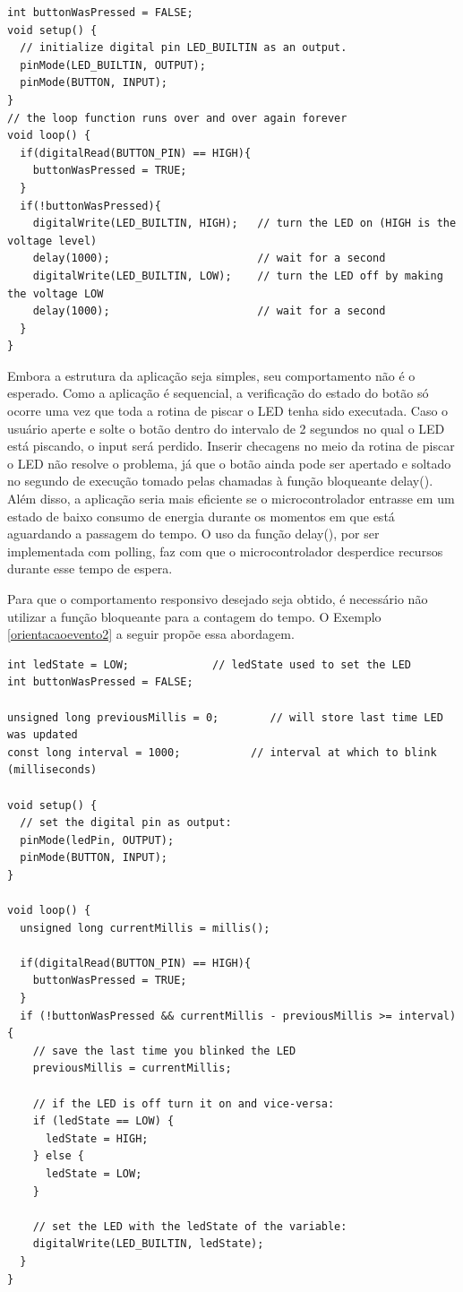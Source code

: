 \documentclass[11pt]{article}
\begin{document}
\begin{lstlisting}[style=CStyle,label=orientacaoevento1,caption=Aplicação bloqueante]
int buttonWasPressed = FALSE;
void setup() {
  // initialize digital pin LED_BUILTIN as an output.
  pinMode(LED_BUILTIN, OUTPUT);
  pinMode(BUTTON, INPUT);
}
// the loop function runs over and over again forever
void loop() {
  if(digitalRead(BUTTON_PIN) == HIGH){
    buttonWasPressed = TRUE;
  }
  if(!buttonWasPressed){ 
    digitalWrite(LED_BUILTIN, HIGH);   // turn the LED on (HIGH is the voltage level)
    delay(1000);                       // wait for a second
    digitalWrite(LED_BUILTIN, LOW);    // turn the LED off by making the voltage LOW
    delay(1000);                       // wait for a second
  }
}
\end{lstlisting}
\par Embora a estrutura da aplicação seja simples, seu comportamento não é o esperado. Como a aplicação é sequencial, a verificação do estado do botão só ocorre uma vez que toda a rotina de piscar o LED tenha sido executada. Caso o usuário aperte e solte o botão dentro do intervalo de 2 segundos no qual o LED está piscando, o input será perdido. Inserir checagens no meio da rotina de piscar o LED não resolve o problema, já que o botão ainda pode ser apertado e soltado no segundo de execução tomado pelas chamadas à função bloqueante delay(). Além disso, a aplicação seria mais eficiente se o microcontrolador entrasse em um estado de baixo consumo de energia durante os momentos em que está aguardando a passagem do tempo. O uso da função delay(), por ser implementada com polling, faz com que o microcontrolador desperdice recursos durante esse tempo de espera.
\par Para que o comportamento responsivo desejado seja obtido, é necessário não utilizar a função bloqueante para a contagem do tempo. O Exemplo \ref{orientacaoevento2} a seguir propõe essa abordagem.
\begin{lstlisting}[style=CStyle,label=orientacaoevento2,caption=Aplicação não bloqueante]
int ledState = LOW;             // ledState used to set the LED
int buttonWasPressed = FALSE;

unsigned long previousMillis = 0;        // will store last time LED was updated
const long interval = 1000;           // interval at which to blink (milliseconds)

void setup() {
  // set the digital pin as output:
  pinMode(ledPin, OUTPUT);
  pinMode(BUTTON, INPUT);
}

void loop() {
  unsigned long currentMillis = millis();

  if(digitalRead(BUTTON_PIN) == HIGH){
    buttonWasPressed = TRUE;
  }
  if (!buttonWasPressed && currentMillis - previousMillis >= interval) {
    // save the last time you blinked the LED
    previousMillis = currentMillis;

    // if the LED is off turn it on and vice-versa:
    if (ledState == LOW) {
      ledState = HIGH;
    } else {
      ledState = LOW;
    }

    // set the LED with the ledState of the variable:
    digitalWrite(LED_BUILTIN, ledState);
  }
}
\end{lstlisting}
\end{document}
